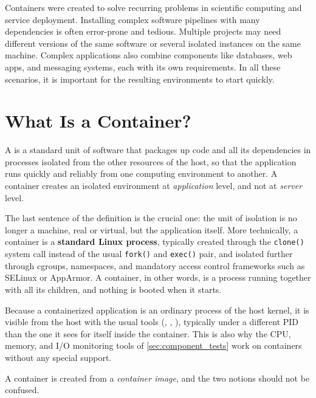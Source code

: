 Containers were created to solve recurring problems in scientific computing and service deployment. Installing complex software pipelines with many dependencies is often error-prone and tedious. Multiple projects may need different versions of the same software or several isolated instances on the same machine. Complex applications also combine components like databases, web apps, and messaging systems, each with its own requirements. In all these scenarios, it is important for the resulting environments to start quickly.

\section{What Is a Container?} \label{sec:what_is_container}

\begin{definitionblock}[Container]
    A  is a standard unit of software that packages up code and all its dependencies in processes isolated from the other resources of the host, so that the application runs quickly and reliably from one computing environment to another. A container creates an isolated environment at \emph{application} level, and not at \emph{server} level.
\end{definitionblock}

The last sentence of the definition is the crucial one: the unit of isolation is no longer a machine, real or virtual, but the application itself. More technically, a container is a \textbf{standard Linux process}, typically created through the \texttt{clone()} system call instead of the usual \texttt{fork()} and \texttt{exec()} pair, and isolated further through cgroups, namespaces, and mandatory access control frameworks such as SELinux or AppArmor. A container, in other words, is a process running together with all its children, and nothing is booted when it starts.

\begin{observationblock}
    Because a containerized application is an ordinary process of the host kernel, it is visible from the host with the usual tools (, , ), typically under a different PID than the one it sees for itself inside the container. This is also why the CPU, memory, and I/O monitoring tools of \cref{sec:component_tests} work on containers without any special support.
\end{observationblock}

A container is created from a \emph{container image}, and the two notions should not be confused.


